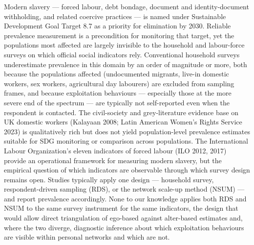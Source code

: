 \documentclass[
  12pt,
  letterpaper,
  DIV=11,
  numbers=noendperiod]{scrartcl}
\begin{document}
Modern slavery --- forced labour, debt bondage, document and
identity-document withholding, and related coercive practices --- is
named under Sustainable Development Goal Target 8.7 as a priority for
elimination by 2030. Reliable prevalence measurement is a precondition
for monitoring that target, yet the populations most affected are
largely invisible to the household and labour-force surveys on which
official social indicators rely. Conventional household surveys
underestimate prevalence in this domain by an order of magnitude or
more, both because the populations affected (undocumented migrants,
live-in domestic workers, sex workers, agricultural day labourers) are
excluded from sampling frames, and because exploitation behaviours ---
especially those at the more severe end of the spectrum --- are
typically not self-reported even when the respondent is contacted. The
civil-society and grey-literature evidence base on UK domestic workers
(Kalayaan 2008; Latin American Women's Rights Service 2023) is
qualitatively rich but does not yield population-level prevalence
estimates suitable for SDG monitoring or comparison across populations.
The International Labour Organization's eleven indicators of forced
labour (ILO 2012, 2017) provide an operational framework for measuring
modern slavery, but the empirical question of which indicators are
observable through which survey design remains open. Studies typically
apply one design --- household survey, respondent-driven sampling (RDS),
or the network scale-up method (NSUM) --- and report prevalence
accordingly. None to our knowledge applies both RDS and NSUM to the same
survey instrument for the same indicators, the design that would allow
direct triangulation of ego-based against alter-based estimates and,
where the two diverge, diagnostic inference about which exploitation
behaviours are visible within personal networks and which are not.
\end{document}

